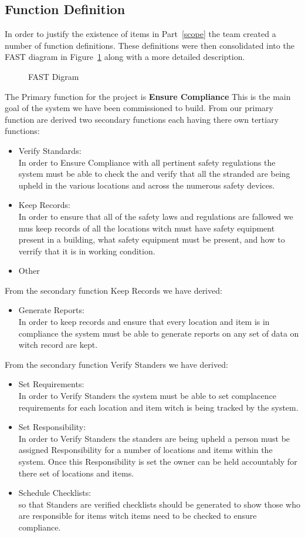 \documentclass[Letter,11pt]{article}
\begin{document}
	\subsection{Function Definition} 
		In order to justify the existence of items in Part~\ref{scope} the team created a number of function definitions. These definitions were then consolidated into the FAST diagram in Figure~\ref{fast1} along with a more detailed description.
		\begin{figure}[h]
			\centering
			
			\caption{\label{fast1} FAST Digram}
		\end{figure}
		The Primary function for the project is \textbf{Ensure Compliance} This is the main goal of the system we have been commissioned to build. From our primary function are derived two secondary functions each having there own tertiary functions:
		\begin{itemize}
			\item Verify Standards:\\
			In order to Ensure Compliance with all pertinent safety regulations the system must be able to check the and verify that all the stranded are being upheld in the various locations and across the numerous safety devices.
			\item Keep Records:\\
			In order to ensure that all of the safety laws and regulations are fallowed we mus keep records of all the locations witch must have safety equipment present in a building, what safety equipment must be present, and how to verrify that it is in working condition.  

			\item Other 
		\end{itemize}
		From the secondary function Keep Records we have derived: 
		\begin{itemize}
			\item Generate Reports:\\
			In order to keep records and ensure that every location and item is in compliance the system must be able to generate reports on any set of data on witch record are kept. 
		\end{itemize}
		From the secondary function Verify Standers we have derived:
		\begin{itemize}
			\item Set Requirements:\\
			In order to Verify Standers the system must be able to set complacence requirements for each location and item witch is being tracked by the system.
			\item Set Responsibility:\\
			In order to Verify Standers the standers are being upheld a person must be assigned Responsibility for a number of locations and items within the system. Once this Responsibility is set the owner can be held accountably for there set of locations and items. 
			\item Schedule Checklists:\\
			so that Standers are verified  checklists should be generated to show those who are responsible for items witch items need to be checked to ensure compliance.
		\end{itemize}
		
\end{document}
